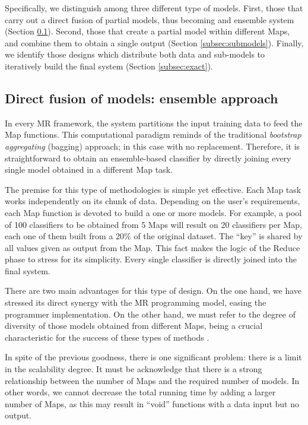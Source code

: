 \documentclass[3p,review]{elsarticle}
\begin{document}
Specifically, we distinguish among three different type of models. First, those that carry out a direct fusion of partial models, thus becoming and ensemble system (Section \ref{subsec:ensemble}). Second, those that create a partial model within different Maps, and combine them to obtain a single output (Section \ref{subsec:submodels}). Finally, we identify those designs which distribute both data and sub-models to iteratively build the final system (Section \ref{subsec:exact}).

\subsection{Direct fusion of models: ensemble approach}\label{subsec:ensemble}

In every MR framework, the system partitions the input training data to feed the Map functions. This computational paradigm reminds of the traditional \textit{bootstrap aggregating} (bagging) approach; in this case with no replacement. Therefore, it is straightforward to obtain an ensemble-based classifier \cite{Polikar2006} by directly joining every single model obtained in a different Map task. 

The premise for this type of methodologies is simple yet effective. Each Map task works independently on its chunk of data. Depending on the user's requirements, each Map function is devoted to build a one or more models. For example, a pool of 100 classifiers to be obtained from 5 Maps will result on 20 classifiers per Map, each one of them built from a 20\% of the original dataset. The ``key'' is shared by all values given as output from the Map. This fact makes the logic of the Reduce phase to stress for its simplicity. Every single classifier is directly joined into the final system. 

There are two main advantages for this type of design. On the one hand, we have stressed its direct synergy with the MR programming model, easing the programmer implementation. On the other hand, we must refer to the degree of diversity of those models obtained from different Maps, being a crucial characteristic for the success of these types of methods \cite{Kuncheva05}. 

In spite of the previous goodness, there is one significant problem: there is a limit in the scalability degree. It must be acknowledge that there is a strong relationship between the number of Maps and the required number of models. In other words, we cannot decrease the total running time by adding a larger number of Maps, as this may result in ``void'' functions with a data input but no output. 
\end{document}
